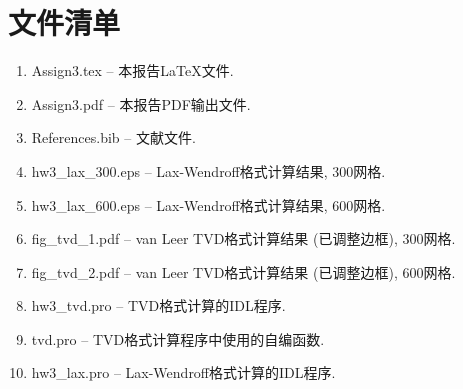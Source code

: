 \documentclass[10.5pt
]{article}
\begin{document}
\section*{文件清单}
\begin{enumerate}
\item
Assign3.tex -- 本报告\LaTeX 文件.
\item
Assign3.pdf -- 本报告PDF输出文件.
\item
References.bib -- 文献文件.
\item
hw3\_lax\_300.eps -- Lax-Wendroff格式计算结果, 300网格.
\item
hw3\_lax\_600.eps -- Lax-Wendroff格式计算结果, 600网格.
\item
fig\_tvd\_1.pdf -- van Leer TVD格式计算结果 (已调整边框), 300网格.
\item
fig\_tvd\_2.pdf -- van Leer TVD格式计算结果 (已调整边框), 600网格.
\item 
hw3\_tvd.pro -- TVD格式计算的IDL程序.
\item 
tvd.pro -- TVD格式计算程序中使用的自编函数.
\item 
hw3\_lax.pro -- Lax-Wendroff格式计算的IDL程序.
\end{enumerate}



\end{document}
